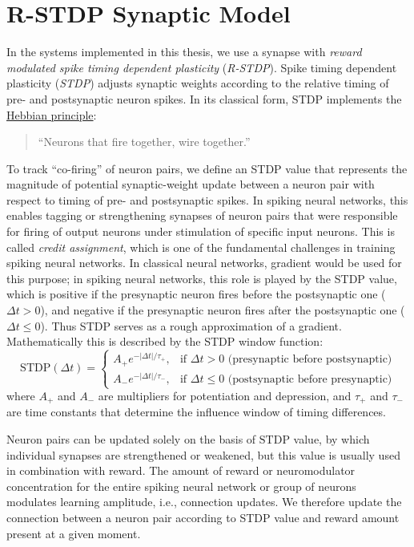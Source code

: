 \documentclass[a4paper,12pt,openright]{book}
\begin{document}
\section{R-STDP Synaptic Model}
\label{sec:synapse_model}
In the systems implemented in this thesis, we use a synapse with \textit{reward modulated spike timing dependent plasticity} (\textit{R-STDP}).
Spike timing dependent plasticity (\textit{STDP}) adjusts synaptic weights according to the relative timing of pre- and postsynaptic neuron spikes. In its classical form, STDP implements the \href{https://en.wikipedia.org/wiki/Hebbian_theory}{Hebbian principle}:
\begin{quote}
``Neurons that fire together, wire together.''
\end{quote}
To track ``co-firing'' of neuron pairs, we define an STDP value that represents the magnitude of potential synaptic-weight update between a neuron pair with respect to timing of pre- and postsynaptic spikes. In spiking neural networks, this enables tagging or strengthening synapses of neuron pairs that were responsible for firing of output neurons under stimulation of specific input neurons. This is called \textit{credit assignment}, which is one of the fundamental challenges in training spiking neural networks. In classical neural networks, gradient would be used for this purpose; in spiking neural networks, this role is played by the STDP value, which is positive if the presynaptic neuron fires before the postsynaptic one (\(\Delta t > 0\)), and negative if the presynaptic neuron fires after the postsynaptic one (\(\Delta t \leq 0\)). Thus STDP serves as a rough approximation of a gradient. Mathematically this is described by the STDP window function: 
\[
\mathrm{STDP}(\Delta t) =
\begin{cases}
A_+ e^{-|\Delta t|/\tau_+}, & \text{if } \Delta t > 0 \text{ (presynaptic before postsynaptic)} \\
A_- e^{-|\Delta t|/\tau_-}, & \text{if } \Delta t \le 0 \text{ (postsynaptic before presynaptic)}
\end{cases}
\]
\noindent where \(A_+\) and \(A_-\) are multipliers for potentiation and depression, and \(\tau_+\) and \(\tau_-\) are time constants that determine the influence window of timing differences.

Neuron pairs can be updated solely on the basis of $\mathrm{STDP}$ value, by which individual synapses are strengthened or weakened, but this value is usually used in combination with reward. The amount of reward or neuromodulator concentration for the entire spiking neural network or group of neurons modulates learning amplitude, i.e., connection updates. We therefore update the connection between a neuron pair according to STDP value and reward amount present at a given moment.
\end{document}
